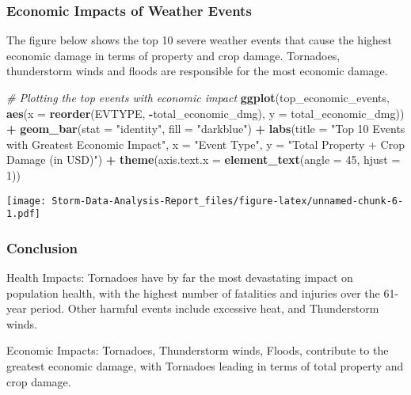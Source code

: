 \documentclass[
]{article}
\newenvironment{Shaded}{\begin{snugshade}}{\end{snugshade}}
\newcommand{\AttributeTok}[1]{\textcolor[rgb]{0.13,0.29,0.53}{#1}}
\newcommand{\CommentTok}[1]{\textcolor[rgb]{0.56,0.35,0.01}{\textit{#1}}}
\newcommand{\DecValTok}[1]{\textcolor[rgb]{0.00,0.00,0.81}{#1}}
\newcommand{\FunctionTok}[1]{\textcolor[rgb]{0.13,0.29,0.53}{\textbf{#1}}}
\newcommand{\NormalTok}[1]{#1}
\newcommand{\SpecialCharTok}[1]{\textcolor[rgb]{0.81,0.36,0.00}{\textbf{#1}}}
\newcommand{\StringTok}[1]{\textcolor[rgb]{0.31,0.60,0.02}{#1}}
\begin{document}
\hypertarget{economic-impacts-of-weather-events}{%
\subsubsection{Economic Impacts of Weather
Events}\label{economic-impacts-of-weather-events}}

The figure below shows the top 10 severe weather events that cause the
highest economic damage in terms of property and crop damage. Tornadoes,
thunderstorm winds and floods are responsible for the most economic
damage.

\begin{Shaded}
\begin{Highlighting}[]
\CommentTok{\# Plotting the top events with economic impact}
\FunctionTok{ggplot}\NormalTok{(top\_economic\_events, }\FunctionTok{aes}\NormalTok{(}\AttributeTok{x =} \FunctionTok{reorder}\NormalTok{(EVTYPE, }\SpecialCharTok{{-}}\NormalTok{total\_economic\_dmg), }
                                \AttributeTok{y =}\NormalTok{ total\_economic\_dmg)) }\SpecialCharTok{+}
  \FunctionTok{geom\_bar}\NormalTok{(}\AttributeTok{stat =} \StringTok{"identity"}\NormalTok{, }\AttributeTok{fill =} \StringTok{"darkblue"}\NormalTok{) }\SpecialCharTok{+}
  \FunctionTok{labs}\NormalTok{(}\AttributeTok{title =} \StringTok{"Top 10 Events with Greatest Economic Impact"}\NormalTok{, }
       \AttributeTok{x =} \StringTok{"Event Type"}\NormalTok{, }\AttributeTok{y =} \StringTok{"Total Property + Crop Damage (in USD)"}\NormalTok{) }\SpecialCharTok{+}
  \FunctionTok{theme}\NormalTok{(}\AttributeTok{axis.text.x =} \FunctionTok{element\_text}\NormalTok{(}\AttributeTok{angle =} \DecValTok{45}\NormalTok{, }\AttributeTok{hjust =} \DecValTok{1}\NormalTok{))}
\end{Highlighting}
\end{Shaded}

\texttt{[image: Storm-Data-Analysis-Report\_files/figure-latex/unnamed-chunk-6-1.pdf]}

\hypertarget{conclusion}{%
\subsubsection{Conclusion}\label{conclusion}}

Health Impacts: Tornadoes have by far the most devastating impact on
population health, with the highest number of fatalities and injuries
over the 61-year period. Other harmful events include excessive heat,
and Thunderstorm winds.

Economic Impacts: Tornadoes, Thunderstorm winds, Floods, contribute to
the greatest economic damage, with Tornadoes leading in terms of total
property and crop damage.
\end{document}
